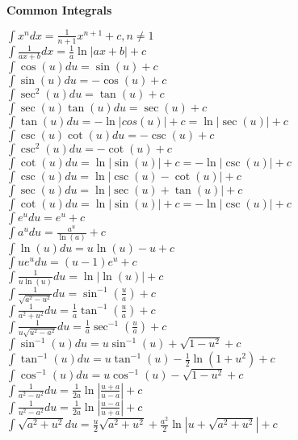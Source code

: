 \documentclass{article}
\begin{document}
\begin{multicols*}{3}
\noindent\hrulefill\\
{\centering
\textbf{Common Integrals} \par
}
\vspace{-0.5cm}\begin{flushleft}
$\int x^ndx=\frac{1}{n+1}x^{n+1}+c,n\not=1$ \\
$\int \frac{1}{ax+b}dx=\frac{1}{a}\ln|ax+b|+c$\\
$\int \cos (u)du=\sin(u)+c$ \\
$\int \sin (u)du=-\cos(u)+c$ \\
$\int \sec^2 (u)du=\tan(u)+c$ \\
$\int \sec(u)\tan(u)du=\sec(u)+c$ \\
$\int \tan(u)du=-\ln|cos(u)|+c=\ln|\sec(u)|+c$ \\
$\int \csc(u)\cot(u)du=-\csc(u)+c$ \\
$\int \csc^2(u)du=-\cot(u)+c$ \\
$\int \cot(u)du=\ln|\sin(u)|+c=-\ln|\csc(u)|+c$ \\
$\int \csc(u)du=\ln|\csc(u)-\cot(u)|+c$ \\
$\int \sec(u)du=\ln|\sec(u)+\tan(u)|+c$ \\
$\int \cot(u)du=\ln|\sin(u)|+c=-\ln|\csc(u)|+c$ \\
$\int e^udu=e^u+c$ \\
$\int a^udu=\frac{a^u}{\ln(a)}+c$ \\
$\int \ln(u)du=u\ln(u)-u+c$ \\
$\int ue^udu=(u-1)e^u+c$ \\
$\int \frac{1}{u\ln(u)}du=\ln|\ln(u)|+c$ \\
$\int \frac{1}{\sqrt{a^2-u^2}}du=\sin^{-1}(\frac{u}{a})+c$ \\
$\int \frac{1}{a^2+u^2}du=\frac{1}{a}\tan^{-1}(\frac{u}{a})+c$ \\
$\int \frac{1}{u\sqrt{u^2-a^2}}du=\frac{1}{a}\sec^{-1}(\frac{u}{a})+c$ \\
$\int \sin^{-1}(u)du=u\sin^{-1}(u)+\sqrt{1-u^2}+c$ \\
$\int \tan^{-1}(u)du=u\tan^{-1}(u)-\frac{1}{2}\ln(1+u^2)+c$ \\
$\int \cos^{-1}(u)du=u\cos^{-1}(u)-\sqrt{1-u^2}+c$ \\
$\int \frac{1}{a^2-u^2}du=\frac{1}{2a}\ln|\frac{u+a}{u-a}|+c$ \\
$\int \frac{1}{u^2-a^2}du=\frac{1}{2a}\ln|\frac{u-a}{u+a}|+c$ \\
$\int \sqrt{a^2+u^2}du=\frac{u}{2}\sqrt{a^2+u^2}+\frac{a^2}{2}\ln|u+\sqrt{a^2+u^2}|+c$ \\

\end{flushleft}
\end{multicols*}
\end{document}
